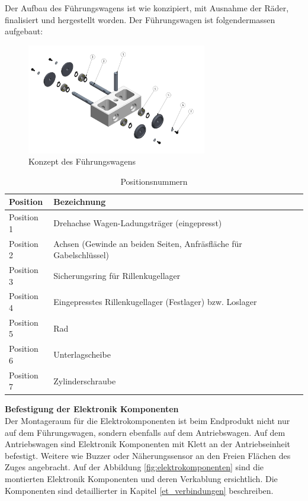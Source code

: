 \documentclass[../../main.tex]{subfiles}
\begin{document}
Der Aufbau des Führungswagens ist wie konzipiert, mit Ausnahme der Räder, finalisiert und hergestellt worden. Der Führungswagen ist folgendermassen aufgebaut:\\

\begin{figure}[H]
  \centering
  \includegraphics[width=0.7\textwidth]{fuehrungswagen.PNG}
  \caption {Konzept des Führungswagens}
  \label{fig:fuehrungswagen2}
\end{figure}

\begin{table}[H] \centering
  \begin{tabular}{|l|l|}
  \hline
  \textbf{Position} & \textbf{Bezeichnung}\\
  \hline
  Position 1          & Drehachse Wagen-Ladungsträger (eingepresst)\\
   \hline
  Position 2          & Achsen (Gewinde an beiden Seiten, Anfräsfläche für Gabelschlüssel)\\
   \hline
  Position 3          & Sicherungsring für Rillenkugellager\\
  \hline
  Position 4          & Eingepresstes Rillenkugellager (Festlager) bzw. Loslager\\
  \hline
  Position 5          & Rad\\
  \hline
  Position 6          & Unterlagscheibe\\
  \hline
  Position 7          & Zylinderschraube\\
  \hline
  \end{tabular}
\caption{Positionsnummern}
\label{tab:expl_antriebswagen}
\end{table}

\pagebreak

\textbf{Befestigung der Elektronik Komponenten}\\
Der Montageraum für die Elektrokomponenten ist beim Endprodukt nicht nur auf dem Führungswagen, sondern ebenfalls auf dem Antriebswagen. Auf dem Antriebswagen sind Elektronik Komponenten mit Klett an der Antriebseinheit befestigt. Weitere wie Buzzer oder Näherungssensor an den Freien Flächen des Zuges angebracht. Auf der Abbildung \ref{fig:elektrokomponenten} sind die montierten Elektronik Komponenten und deren Verkablung ersichtlich. Die Komponenten sind detaillierter in Kapitel \ref{et_verbindungen} beschreiben.\\
\end{document}
